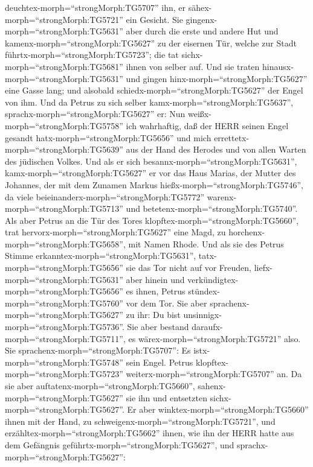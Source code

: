 deuchtex-morph=``strongMorph:TG5707'' ihn, er
sähex-morph=``strongMorph:TG5721'' ein Gesicht.  Sie
gingenx-morph=``strongMorph:TG5631'' aber durch die erste und andere Hut
und kamenx-morph=``strongMorph:TG5627'' zu der eisernen Tür, welche zur
Stadt führtx-morph=``strongMorph:TG5723''; die tat
sichx-morph=``strongMorph:TG5681'' ihnen von selber auf. Und sie traten
hinausx-morph=``strongMorph:TG5631'' und gingen
hinx-morph=``strongMorph:TG5627'' eine Gasse lang; und alsobald
schiedx-morph=``strongMorph:TG5627'' der Engel von ihm. 
Und da Petrus zu sich selber kamx-morph=``strongMorph:TG5637'',
sprachx-morph=``strongMorph:TG5627'' er: Nun
weißx-morph=``strongMorph:TG5758'' ich wahrhaftig, daß der HERR seinen
Engel gesandt hatx-morph=``strongMorph:TG5656'' und mich
errettetx-morph=``strongMorph:TG5639'' aus der Hand des Herodes und von
allen Warten des jüdischen Volkes.  Und als er sich
besannx-morph=``strongMorph:TG5631'', kamx-morph=``strongMorph:TG5627''
er vor das Haus Marias, der Mutter des Johannes, der mit dem Zunamen
Markus hießx-morph=``strongMorph:TG5746'', da viele
beieinanderx-morph=``strongMorph:TG5772''
warenx-morph=``strongMorph:TG5713'' und
betetenx-morph=``strongMorph:TG5740''.  Als aber Petrus an
die Tür des Tores klopftex-morph=``strongMorph:TG5660'', trat
hervorx-morph=``strongMorph:TG5627'' eine Magd, zu
horchenx-morph=``strongMorph:TG5658'', mit Namen Rhode. 
Und als sie des Petrus Stimme erkanntex-morph=``strongMorph:TG5631'',
tatx-morph=``strongMorph:TG5656'' sie das Tor nicht auf vor Freuden,
liefx-morph=``strongMorph:TG5631'' aber hinein und
verkündigtex-morph=``strongMorph:TG5656'' es ihnen, Petrus
stündex-morph=``strongMorph:TG5760'' vor dem Tor.  Sie aber
sprachenx-morph=``strongMorph:TG5627'' zu ihr: Du bist
unsinnigx-morph=``strongMorph:TG5736''. Sie aber bestand
daraufx-morph=``strongMorph:TG5711'', es
wärex-morph=``strongMorph:TG5721'' also. Sie
sprachenx-morph=``strongMorph:TG5707'': Es
istx-morph=``strongMorph:TG5748'' sein Engel.  Petrus
klopftex-morph=``strongMorph:TG5723''
weiterx-morph=``strongMorph:TG5707'' an. Da sie aber
auftatenx-morph=``strongMorph:TG5660'',
sahenx-morph=``strongMorph:TG5627'' sie ihn und entsetzten
sichx-morph=``strongMorph:TG5627''.  Er aber
winktex-morph=``strongMorph:TG5660'' ihnen mit der Hand, zu
schweigenx-morph=``strongMorph:TG5721'', und
erzähltex-morph=``strongMorph:TG5662'' ihnen, wie ihn der HERR hatte aus
dem Gefängnis geführtx-morph=``strongMorph:TG5627'', und
sprachx-morph=``strongMorph:TG5627'':

